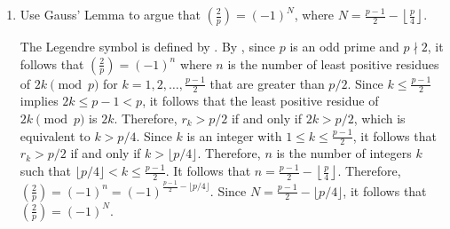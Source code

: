 \begin{enumerate}
\begin{define}{Lemma 4.7 (Gauss's Lemma)*}[lem:4.7][red]
\begin{subprove}
    Consider $p-r_1,\dots,p-r_n,s_1,\dots,s_m$. These lie in $\{1,\dots,(p-1)/2\}$ and are pairwise distinct modulo $p$: distinct $r_k,s_k$ by construction; if $p-r_i\equiv s_j\pmod p$, then $r_i+s_j\equiv 0\pmod p$ gives $(k_i+k_j)a\equiv 0\pmod p$, forcing $k_i+k_j=p$ (contradiction).
  
    Therefore, these form a permutation of $\{1,\dots,(p-1)/2\}$:
    \[
    \prod_{i=1}^n (p-r_i)\cdot\prod_{j=1}^m s_j \equiv \left(\frac{p-1}{2}\right)! \pmod p.
    \]
    Since $p-r_i \equiv -r_i\pmod p$ and $\{r_1,\dots,r_n,s_1,\dots,s_m\}$ equals the least positive residues of $a,2a,\dots,\frac{p-1}{2}a$:
    \[
    (-1)^n a^{\frac{p-1}{2}}\left(\frac{p-1}{2}\right)! \equiv \left(\frac{p-1}{2}\right)! \pmod p.
    \]
    Canceling the factorial yields $a^{\frac{p-1}{2}}\equiv (-1)^n\pmod p$. By , $\left(\frac{a}{p}\right)=(-1)^n$.
    \end{subprove}
  \end{define}
  \item Use Gauss' Lemma to argue that $\left(\frac{2}{p}\right)=(-1)^{N}$, where $N=\frac{p-1}{2}-\left\lfloor\frac{p}{4}\right\rfloor$.
  \begin{subprove}
    The Legendre symbol is defined by .
    By , since $p$ is an odd prime and $p \nmid 2$, it follows that $\left(\frac{2}{p}\right) = (-1)^n$ where $n$ is the number of least positive residues of $2k \pmod{p}$ for $k=1,2,\ldots,\frac{p-1}{2}$ that are greater than $p/2$.
    Since $k \leq \frac{p-1}{2}$ implies $2k \leq p-1 < p$, it follows that the least positive residue of $2k \pmod{p}$ is $2k$.
    Therefore, $r_k > p/2$ if and only if $2k > p/2$, which is equivalent to $k > p/4$.
    Since $k$ is an integer with $1 \leq k \leq \frac{p-1}{2}$, it follows that $r_k > p/2$ if and only if $k > \lfloor p/4 \rfloor$.
    Therefore, $n$ is the number of integers $k$ such that $\lfloor p/4 \rfloor < k \leq \frac{p-1}{2}$.
    It follows that $n = \frac{p-1}{2} - \left\lfloor \frac{p}{4} \right\rfloor$.
    Therefore, $\left(\frac{2}{p}\right) = (-1)^n = (-1)^{\frac{p-1}{2} - \lfloor p/4 \rfloor}$.
    Since $N = \frac{p-1}{2} - \lfloor p/4 \rfloor$, it follows that $\left(\frac{2}{p}\right) = (-1)^N$.
  \end{subprove}
  









\end{enumerate}
